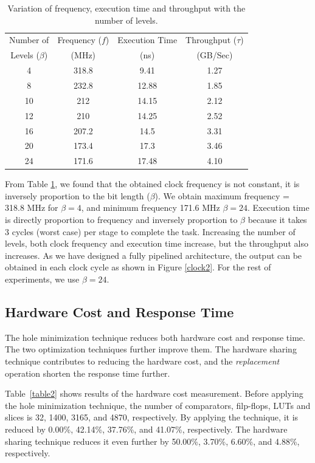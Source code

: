 \documentclass[10pt, conference, compsocconf]{IEEEtran}
\begin{document}
 \begin{table}
 \begin{center}
 \caption{Variation of frequency, execution time and throughput with the number of levels.}
\label{table1}
\begin{tabular}{ |c|c|c|c| }
 \hline
 Number of & Frequency ($f$) & Execution Time& Throughput ($\tau$) \\
 Levels ($\beta$) & (MHz)& (ns)& (GB/Sec)\\
 \hline
 \hline
 4 & 318.8 & 9.41 & 1.27\\
 8 & 232.8 & 12.88 & 1.85\\
 10 & 212 & 14.15 & 2.12 \\
 12 & 210 & 14.25 & 2.52 \\
 16 & 207.2 & 14.5 & 3.31\\
 20 & 173.4 & 17.3 & 3.46 \\
 24 & 171.6 & 17.48 & 4.10\\
 \hline
\end{tabular}
\end{center}
\end{table}

From Table \ref{table1}, we found that the obtained clock frequency is not constant, it is inversely proportion to the bit length ($\beta$).
We obtain maximum frequency = 318.8 MHz for $\beta = 4$, and minimum frequency 171.6 MHz $\beta = 24$.
Execution time is directly proportion to frequency and inversely proportion to $\beta$ because it takes 3 cycles (worst case) per stage to complete the task.
Increasing the number of levels, both clock frequency and execution time increase, but the throughput also increases.
As we have designed a fully pipelined architecture, the output can be obtained in each clock cycle as shown in Figure \ref{clock2}.
For the rest of experiments, we use $\beta = 24$.

\subsection{Hardware Cost and Response Time}

The hole minimization technique reduces both hardware cost and response time.
The two optimization techniques further improve them.
The hardware sharing technique contributes to reducing the hardware cost, and the {\it replacement} operation shorten the response time further.

Table~\ref{table2} shows results of the hardware cost measurement.
Before applying the hole minimization technique, the number of comparators, filp-flops, LUTs and slices is 32, 1400, 3165, and 4870, respectively.
By applying the technique, it is reduced by 0.00\%, 42.14\%, 37.76\%, and 41.07\%, respectively.
The hardware sharing technique reduces it even further by 50.00\%, 3.70\%, 6.60\%, and 4.88\%, respectively.
\end{document}
